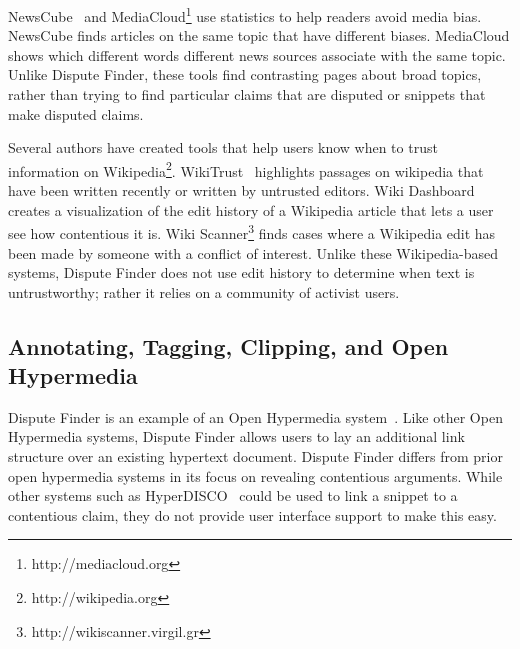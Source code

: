 \documentclass{www2010-submission}
\newcommand{\todo}[1]{}
\begin{document}
\todo{Make sure we stay in sync}

NewsCube~\cite{Park2009} and MediaCloud\footnote{http://mediacloud.org} use statistics to help readers avoid media bias. NewsCube finds articles on the same topic that have different biases. MediaCloud shows which different words different news sources associate with the same topic. Unlike Dispute Finder, these tools find contrasting pages about broad topics, rather than trying to find particular claims that are disputed or snippets that make disputed claims.

Several authors have created tools that help users know when to trust information on Wikipedia\footnote{http://wikipedia.org}. WikiTrust~\cite{Adler2008a} highlights passages on wikipedia that have been written recently or written by untrusted editors. Wiki Dashboard~\cite{Kittur2008} creates a visualization of the edit history of a Wikipedia article that lets a user see how contentious it is. Wiki Scanner\footnote{http://wikiscanner.virgil.gr} finds cases where a Wikipedia edit has been made by someone with a conflict of interest. Unlike these Wikipedia-based systems, Dispute Finder does not use edit history to determine when text is untrustworthy; rather it relies on a community of activist users.

% 
% 

\subsection{Annotating, Tagging, Clipping, and Open Hypermedia}

Dispute Finder is an example of an Open Hypermedia system~\cite{Bouvin2000}. Like other Open Hypermedia systems, Dispute Finder allows users to lay an additional link structure over an existing hypertext document. Dispute Finder differs from prior open hypermedia systems in its focus on revealing contentious arguments. While other systems such as HyperDISCO~\cite{Wiil1996} could be used to link a snippet to a contentious claim, they do not provide user interface support to make this easy.

\todo{Say how different from other Open Hypermedia link annotation systems}
\end{document}
